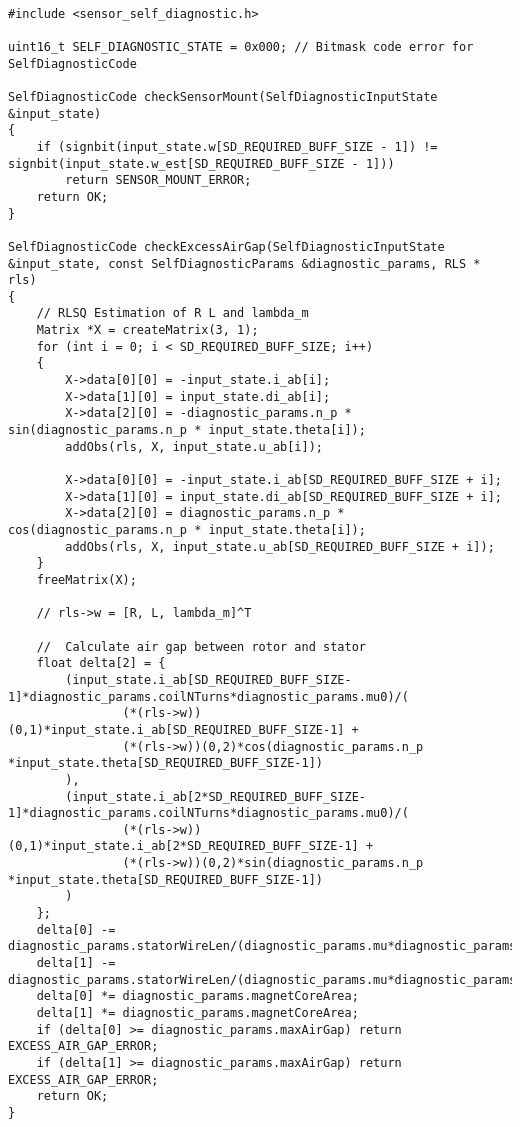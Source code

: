 \begin{lstlisting}[caption=\raggedright{mcu-libs/RLS.h}, frame=single]

#include <sensor_self_diagnostic.h>

uint16_t SELF_DIAGNOSTIC_STATE = 0x000; // Bitmask code error for SelfDiagnosticCode

SelfDiagnosticCode checkSensorMount(SelfDiagnosticInputState &input_state)
{
    if (signbit(input_state.w[SD_REQUIRED_BUFF_SIZE - 1]) != signbit(input_state.w_est[SD_REQUIRED_BUFF_SIZE - 1]))
        return SENSOR_MOUNT_ERROR;
    return OK;
}

SelfDiagnosticCode checkExcessAirGap(SelfDiagnosticInputState &input_state, const SelfDiagnosticParams &diagnostic_params, RLS * rls)
{
    // RLSQ Estimation of R L and lambda_m
    Matrix *X = createMatrix(3, 1);
    for (int i = 0; i < SD_REQUIRED_BUFF_SIZE; i++)
    {
        X->data[0][0] = -input_state.i_ab[i];
        X->data[1][0] = input_state.di_ab[i];
        X->data[2][0] = -diagnostic_params.n_p * sin(diagnostic_params.n_p * input_state.theta[i]);
        addObs(rls, X, input_state.u_ab[i]);

        X->data[0][0] = -input_state.i_ab[SD_REQUIRED_BUFF_SIZE + i];
        X->data[1][0] = input_state.di_ab[SD_REQUIRED_BUFF_SIZE + i];
        X->data[2][0] = diagnostic_params.n_p * cos(diagnostic_params.n_p * input_state.theta[i]);
        addObs(rls, X, input_state.u_ab[SD_REQUIRED_BUFF_SIZE + i]);
    }
    freeMatrix(X);

    // rls->w = [R, L, lambda_m]^T

    //  Calculate air gap between rotor and stator
    float delta[2] = {
        (input_state.i_ab[SD_REQUIRED_BUFF_SIZE-1]*diagnostic_params.coilNTurns*diagnostic_params.mu0)/(
                (*(rls->w))(0,1)*input_state.i_ab[SD_REQUIRED_BUFF_SIZE-1] +
                (*(rls->w))(0,2)*cos(diagnostic_params.n_p *input_state.theta[SD_REQUIRED_BUFF_SIZE-1])
        ),
        (input_state.i_ab[2*SD_REQUIRED_BUFF_SIZE-1]*diagnostic_params.coilNTurns*diagnostic_params.mu0)/(
                (*(rls->w))(0,1)*input_state.i_ab[2*SD_REQUIRED_BUFF_SIZE-1] +
                (*(rls->w))(0,2)*sin(diagnostic_params.n_p *input_state.theta[SD_REQUIRED_BUFF_SIZE-1])
        )
    };
    delta[0] -= diagnostic_params.statorWireLen/(diagnostic_params.mu*diagnostic_params.statorCoreArea);
    delta[1] -= diagnostic_params.statorWireLen/(diagnostic_params.mu*diagnostic_params.statorCoreArea);
    delta[0] *= diagnostic_params.magnetCoreArea;
    delta[1] *= diagnostic_params.magnetCoreArea;
    if (delta[0] >= diagnostic_params.maxAirGap) return EXCESS_AIR_GAP_ERROR;
    if (delta[1] >= diagnostic_params.maxAirGap) return EXCESS_AIR_GAP_ERROR;
    return OK;
}


\end{lstlisting}
